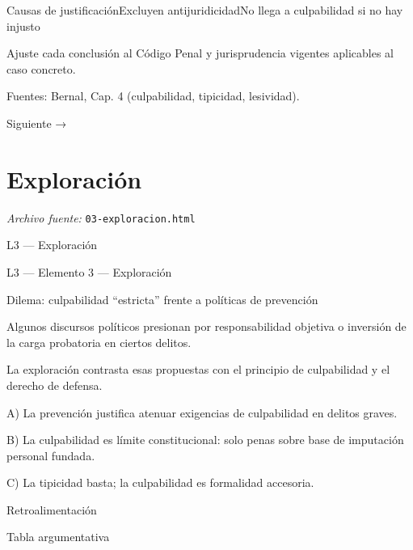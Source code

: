 \documentclass[11pt,a4paper]{article}
\begin{document}
          Causas de justificaciónExcluyen antijuridicidadNo llega a culpabilidad si no hay injusto\par





      Ajuste cada conclusión al Código Penal y jurisprudencia vigentes aplicables al caso concreto.\par




      Fuentes: Bernal, Cap. 4 (culpabilidad, tipicidad, lesividad).\par


    Siguiente →\par

\section{Exploraci\'on}
\noindent\textit{Archivo fuente:} \texttt{03-exploracion.html}

L3 — Exploración\par





    L3 — Elemento 3 — Exploración\par
    Dilema: culpabilidad “estricta” frente a políticas de prevención\par


      Algunos discursos políticos presionan por responsabilidad objetiva o inversión de la carga probatoria en ciertos delitos.\par
      La exploración contrasta esas propuestas con el principio de culpabilidad y el derecho de defensa.\par



       A) La prevención justifica atenuar exigencias de culpabilidad en delitos graves.\par
       B) La culpabilidad es límite constitucional: solo penas sobre base de imputación personal fundada.\par
       C) La tipicidad basta; la culpabilidad es formalidad accesoria.\par
      Retroalimentación\par





      Tabla argumentativa\par
\end{document}

